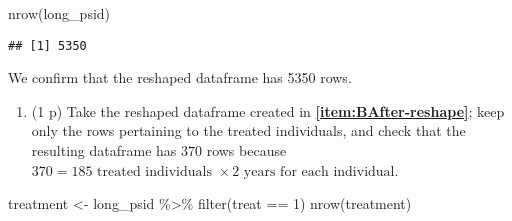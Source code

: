 \documentclass[
]{article}
\newenvironment{Shaded}{\begin{snugshade}}{\end{snugshade}}
\newcommand{\DecValTok}[1]{\textcolor[rgb]{0.00,0.00,0.81}{#1}}
\newcommand{\FunctionTok}[1]{\textcolor[rgb]{0.00,0.00,0.00}{#1}}
\newcommand{\NormalTok}[1]{#1}
\newcommand{\OtherTok}[1]{\textcolor[rgb]{0.56,0.35,0.01}{#1}}
\newcommand{\SpecialCharTok}[1]{\textcolor[rgb]{0.00,0.00,0.00}{#1}}
\newcommand{\StringTok}[1]{\textcolor[rgb]{0.31,0.60,0.02}{#1}}
\providecommand{\tightlist}{%
  \setlength{\itemsep}{0pt}\setlength{\parskip}{0pt}}
\begin{document}
\begin{Shaded}
\end{Shaded}

\begin{Shaded}
\begin{Highlighting}[]
\FunctionTok{nrow}\NormalTok{(long\_psid)}
\end{Highlighting}
\end{Shaded}

\begin{verbatim}
## [1] 5350
\end{verbatim}

We confirm that the reshaped dataframe has 5350 rows.

\begin{enumerate}
\def\labelenumi{\alph{enumi}.}
\setcounter{enumi}{1}
\tightlist
\item
  (1 p) Take the reshaped dataframe created in
  \textbf{\ref{item:BAfter-reshape}}; keep only the rows pertaining to
  the treated individuals, and check that the resulting dataframe has
  \(370\) rows because
  \(370=185 \text{ treated individuals } \times 2 \text{ years for each individual}\).\label{item:BAfter-filter}
\end{enumerate}

\begin{Shaded}
\begin{Highlighting}[]
\NormalTok{treatment }\OtherTok{\textless{}{-}}\NormalTok{ long\_psid }\SpecialCharTok{\%\textgreater{}\%} \FunctionTok{filter}\NormalTok{(treat }\SpecialCharTok{==} \DecValTok{1}\NormalTok{)}
\FunctionTok{nrow}\NormalTok{(treatment)}
\end{Highlighting}
\end{Shaded}
\end{document}
